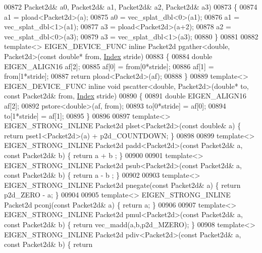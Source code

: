 \begin{DoxyCode}
{00872                       Packet2d& a0, Packet2d& a1, Packet2d& a2, Packet2d& a3)
00873 \{
00874   a1 = pload<Packet2d>(a);
00875   a0 = vec\_splat\_dbl<0>(a1);
00876   a1 = vec\_splat\_dbl<1>(a1);
00877   a3 = pload<Packet2d>(a+2);
00878   a2 = vec\_splat\_dbl<0>(a3);
00879   a3 = vec\_splat\_dbl<1>(a3);
00880 \}
00881 
00882 \textcolor{keyword}{template}<> EIGEN\_DEVICE\_FUNC \textcolor{keyword}{inline} Packet2d pgather<double, Packet2d>(\textcolor{keyword}{const} \textcolor{keywordtype}{double}* from, 
      \hyperlink{namespace_eigen_a62e77e0933482dafde8fe197d9a2cfde}{Index} stride)
00883 \{
00884   \textcolor{keywordtype}{double} EIGEN\_ALIGN16 af[2];
00885   af[0] = from[0*stride];
00886   af[1] = from[1*stride];
00887  \textcolor{keywordflow}{return} pload<Packet2d>(af);
00888 \}
00889 \textcolor{keyword}{template}<> EIGEN\_DEVICE\_FUNC \textcolor{keyword}{inline} \textcolor{keywordtype}{void} pscatter<double, Packet2d>(\textcolor{keywordtype}{double}* to, \textcolor{keyword}{const} Packet2d& from, 
      \hyperlink{namespace_eigen_a62e77e0933482dafde8fe197d9a2cfde}{Index} stride)
00890 \{
00891   \textcolor{keywordtype}{double} EIGEN\_ALIGN16 af[2];
00892   pstore<double>(af, from);
00893   to[0*stride] = af[0];
00894   to[1*stride] = af[1];
00895 \}
00896 
00897 \textcolor{keyword}{template}<> EIGEN\_STRONG\_INLINE Packet2d plset<Packet2d>(\textcolor{keyword}{const} \textcolor{keywordtype}{double}& a) \{ \textcolor{keywordflow}{return} pset1<Packet2d>(a) + 
      p2d\_COUNTDOWN; \}
00898 
00899 \textcolor{keyword}{template}<> EIGEN\_STRONG\_INLINE Packet2d padd<Packet2d>(\textcolor{keyword}{const} Packet2d& a, \textcolor{keyword}{const} Packet2d& b) \{ \textcolor{keywordflow}{return} a + b
      ; \}
00900 
00901 \textcolor{keyword}{template}<> EIGEN\_STRONG\_INLINE Packet2d psub<Packet2d>(\textcolor{keyword}{const} Packet2d& a, \textcolor{keyword}{const} Packet2d& b) \{ \textcolor{keywordflow}{return} a - b
      ; \}
00902 
00903 \textcolor{keyword}{template}<> EIGEN\_STRONG\_INLINE Packet2d pnegate(\textcolor{keyword}{const} Packet2d& a) \{ \textcolor{keywordflow}{return} p2d\_ZERO - a; \}
00904 
00905 \textcolor{keyword}{template}<> EIGEN\_STRONG\_INLINE Packet2d pconj(\textcolor{keyword}{const} Packet2d& a) \{ \textcolor{keywordflow}{return} a; \}
00906 
00907 \textcolor{keyword}{template}<> EIGEN\_STRONG\_INLINE Packet2d pmul<Packet2d>(\textcolor{keyword}{const} Packet2d& a, \textcolor{keyword}{const} Packet2d& b) \{ \textcolor{keywordflow}{return} 
      vec\_madd(a,b,p2d\_MZERO); \}
00908 \textcolor{keyword}{template}<> EIGEN\_STRONG\_INLINE Packet2d pdiv<Packet2d>(\textcolor{keyword}{const} Packet2d& a, \textcolor{keyword}{const} Packet2d& b) \{ \textcolor{keywordflow}{return} 
}
\end{DoxyCode}
